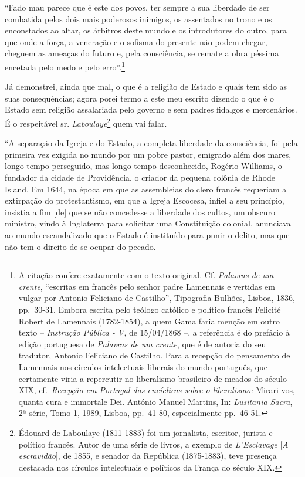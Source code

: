 ``Fado mau parece que é este dos povos, ter sempre a sua liberdade de ser
combatida pelos dois mais poderosos inimigos, os assentados no trono e
os enconstados ao altar, os árbitros deste mundo e os introdutores do
outro, para que onde a força, a veneração e o sofisma do presente não
podem chegar, cheguem as ameaças do futuro e, pela consciência, se
remate a obra péssima encetada pelo medo e pelo erro''.\footnote{A
  citação confere exatamente com o texto original. Cf. \emph{Palavras de
  um crente}, ``escritas em francês pelo senhor padre Lamennais e
  vertidas em vulgar por Antonio Feliciano de Castilho'', Tipografia
  Bulhões, Lisboa, 1836, pp.~30-31. Embora escrita pelo teólogo católico
  e político francês Felicité Robert de Lamennais (1782-1854), a quem
  Gama faria menção em outro texto -- \emph{Instrução Pública - V}, de
  15/04/1868 --, a referência é do prefácio à edição portuguesa de
  \emph{Palavras de um crente}, que é de autoria do seu tradutor,
  Antonio Feliciano de Castilho. Para a recepção do pensamento de
  Lamennais nos círculos intelectuais liberais do mundo português, que
  certamente viria a repercutir no liberalismo brasileiro de meados do
  século XIX, cf.~\emph{Recepção em Portugal das encíclicas sobre o
  liberalismo:} Mirari vos, quanta cura e immortale Dei. António Manuel
  Martins, In: \emph{Lusitania Sacra}, 2ª série, Tomo 1, 1989, Lisboa,
  pp.~41-80, especialmente pp.~46-51.}

Já demonstrei, ainda que mal, o que é a religião de Estado e quais tem
sido as suas consequências; agora porei termo a este meu escrito dizendo
o que é o Estado sem religião assalariada pelo governo e sem padres
fidalgos e mercenários. É o respeitável sr. \emph{Laboulaye}\footnote{
  Édouard de Laboulaye (1811-1883) foi um jornalista, escritor, jurista
  e político francês. Autor de uma série de livros, a exemplo de
  \emph{L'Esclavage} {[}\emph{A escravidão}{]}, de 1855, e senador da
  República (1875-1883), teve presença destacada nos círculos
  intelectuais e políticos da França do século XIX.} quem vai falar.

``A separação da Igreja e do Estado, a completa liberdade da consciência,
foi pela primeira vez exigida no mundo por um pobre pastor, emigrado
além dos mares, longo tempo perseguido, mas longo tempo desconhecido,
Rogério Williams, o fundador da cidade de Providência, o criador da
pequena colônia de Rhode Island. Em 1644, na época em que as assembleias
do clero francês requeriam a extirpação do protestantismo, em que a
Igreja Escocesa, infiel a seu princípio, insistia a fim {[}de{]} que se
não concedesse a liberdade dos cultos, um obscuro ministro, vindo à
Inglaterra para solicitar uma Constituição colonial, anunciava ao mundo
escandalizado que o Estado é instituído para punir o delito, mas que não
tem o direito de se ocupar do pecado.

